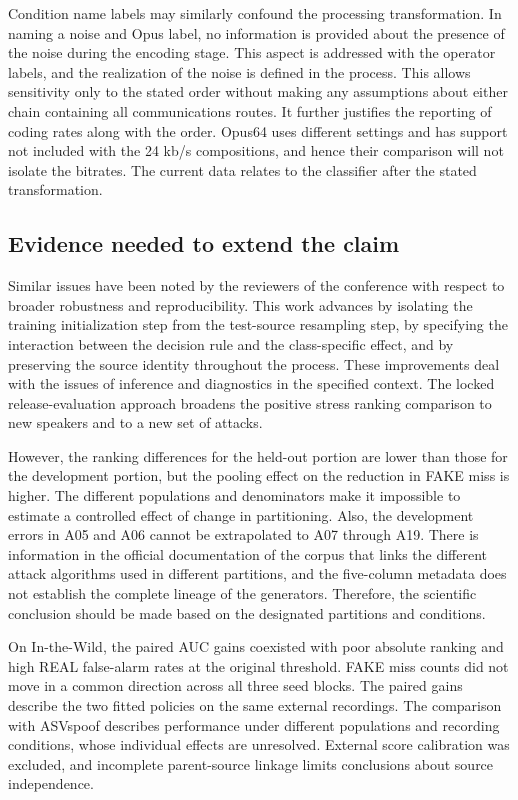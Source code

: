 Condition name labels may similarly confound the processing transformation. In naming a noise and Opus label, no information is provided about the presence of the noise during the encoding stage. This aspect is addressed with the operator labels, and the realization of the noise is defined in the process. This allows sensitivity only to the stated order without making any assumptions about either chain containing all communications routes. It further justifies the reporting of coding rates along with the order. Opus64 uses different settings and has support not included with the 24 kb/s compositions, and hence their comparison will not isolate the bitrates. The current data relates to the classifier after the stated transformation.

\subsection{Evidence needed to extend the claim}

Similar issues have been noted by the reviewers of the conference with respect to broader robustness and reproducibility. This work advances by isolating the training initialization step from the test-source resampling step, by specifying the interaction between the decision rule and the class-specific effect, and by preserving the source identity throughout the process. These improvements deal with the issues of inference and diagnostics in the specified context. The locked release-evaluation approach broadens the positive stress ranking comparison to new speakers and to a new set of attacks.

However, the ranking differences for the held-out portion are lower than those for the development portion, but the pooling effect on the reduction in FAKE miss is higher. The different populations and denominators make it impossible to estimate a controlled effect of change in partitioning. Also, the development errors in A05 and A06 cannot be extrapolated to A07 through A19. There is information in the official documentation of the corpus that links the different attack algorithms used in different partitions, and the five-column metadata does not establish the complete lineage of the generators. Therefore, the scientific conclusion should be made based on the designated partitions and conditions.

On In-the-Wild, the paired AUC gains coexisted with poor absolute ranking and high REAL false-alarm rates at the original threshold. FAKE miss counts did not move in a common direction across all three seed blocks. The paired gains describe the two fitted policies on the same external recordings. The comparison with ASVspoof describes performance under different populations and recording conditions, whose individual effects are unresolved. External score calibration was excluded, and incomplete parent-source linkage limits conclusions about source independence.
